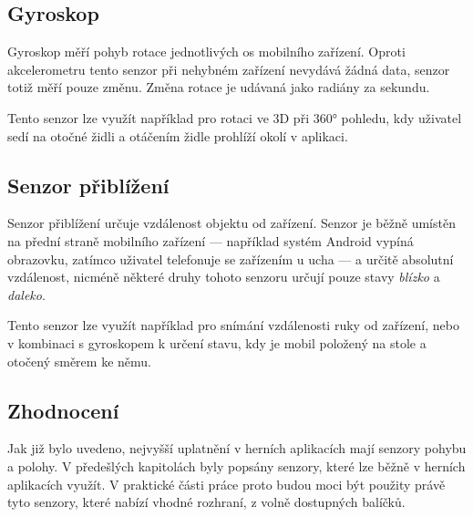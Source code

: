 \subsection{Gyroskop}

Gyroskop měří pohyb rotace jednotlivých os mobilního zařízení.
Oproti akcelerometru tento senzor při nehybném zařízení
nevydává žádná data,
senzor totiž měří pouze změnu.
Změna rotace je udávaná jako radiány za sekundu.  
\cite{sensors_motion}

Tento senzor lze využít například pro rotaci ve 3D při 360° pohledu,
kdy uživatel sedí na otočné židli a otáčením židle prohlíží okolí v aplikaci.

\subsection{Senzor přiblížení}

Senzor přiblížení určuje vzdálenost objektu od zařízení.
Senzor je běžně umístěn na přední straně mobilního zařízení
--- například systém Android vypíná obrazovku,
zatímco uživatel telefonuje se zařízením u ucha ---
a určitě absolutní vzdálenost,
nicméně některé druhy tohoto senzoru určují pouze
stavy \emph{blízko} a \emph{daleko}.
\cite{sensors_position}

Tento senzor lze využít například pro snímání vzdálenosti ruky od zařízení,
nebo v kombinaci s gyroskopem k určení stavu,
kdy je mobil položený na stole a otočený směrem ke němu.

\subsection{Zhodnocení}

Jak již bylo uvedeno,
nejvyšší uplatnění v herních aplikacích mají senzory pohybu a polohy.
V předešlých kapitolách byly popsány senzory,
které lze běžně v herních aplikacích využít.
V praktické části práce proto budou moci být použity právě tyto senzory,
které nabízí vhodné rozhraní,
z volně dostupných balíčků.
